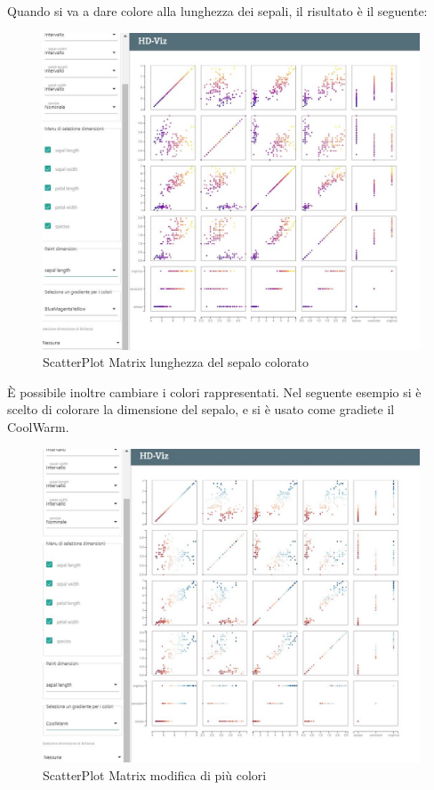 \documentclass[../manuale_utente.tex]{subfiles}
\begin{document}
Quando si va a dare colore alla lunghezza dei sepali, il risultato è il seguente:

\begin{figure}[H]
	\centering
	\includegraphics[width=18cm]{src/img/spm/spm_colore_dimensione_sepal.jpg}
	\caption{ScatterPlot Matrix lunghezza del sepalo colorato}
\end{figure}

È possibile inoltre cambiare i colori rappresentati. Nel seguente esempio si è scelto di colorare la dimensione del sepalo, e si è usato come gradiete il CoolWarm.

\begin{figure}[H]
	\centering
	\includegraphics[width=18cm]{src/img/spm/spm_mix_colori.jpg}
	\caption{ScatterPlot Matrix modifica di più colori}
\end{figure}
\end{document}
